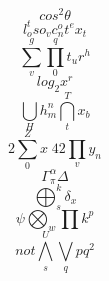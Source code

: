 \begin{equation} cos^2 \theta \end{equation}
\begin{equation} l_o^{t} s o_v c^o_n t^e x_t \end{equation}
\begin{equation}  \sum_v^g \prod_0^q t_u r^h \end{equation}
\begin{equation} log_2 x^r \end{equation}
\begin{equation}  \bigcup_H h_m^n \bigcap_t^T x_b \end{equation}
\begin{equation} 2 \sum_0^Z x \; 42 \prod_v y_n \end{equation}
\begin{equation} \Gamma^{\alpha}_{ \pi} \Delta \end{equation}
\begin{equation}  \bigoplus_s^k \delta_x \end{equation}
\begin{equation}  \psi \bigotimes_w \prod k^p  \end{equation}
\begin{equation} not \bigwedge_s^U \bigvee_q pq^2 \end{equation}